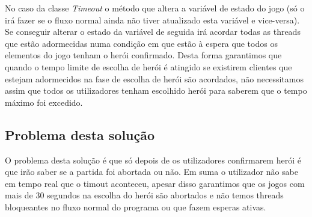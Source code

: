 No caso da classe \textit{Timeout} o método que altera a variável de estado do jogo (só o irá fazer se o fluxo normal ainda não tiver atualizado esta variável e vice-versa). Se conseguir alterar o estado da variável de seguida irá acordar todas as threads que estão adormecidas numa condição em que estão à espera que todos os elementos do jogo tenham o herói confirmado. Desta forma garantimos que quando o tempo limite de escolha de herói é atingido se existirem clientes que estejam adormecidos na fase de escolha de herói são acordados, não necessitamos assim que todos os utilizadores tenham escolhido herói para saberem que o tempo máximo foi excedido. 

\subsection{Problema desta solução}
O problema desta solução é que só depois de os utilizadores confirmarem herói é que irão saber se a partida foi abortada ou não. 
Em suma  o utilizador não sabe em tempo real que o timout aconteceu, apesar disso garantimos que os jogos com mais de 30 segundos na escolha do herói são abortados e não temos threads bloqueantes no fluxo normal do programa ou que fazem esperas ativas.
  
